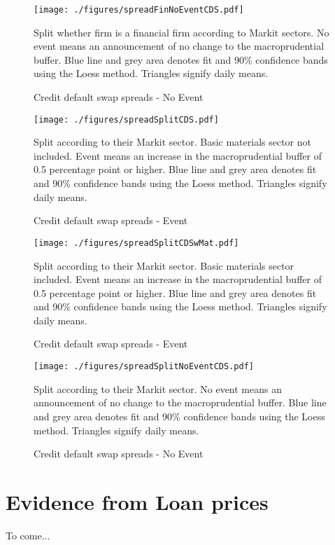 \documentclass[11pt]{article}
\newcommand\fnote[1]{\captionsetup{font=small}\caption*{#1}}
\begin{document}
\begin{figure}%
	\centering
	\texttt{[image: ./figures/spreadFinNoEventCDS.pdf]}
	\caption{Credit default swap spreads - No Event}
	\label{fig:eventCDSFinNoEvent}
	\fnote{Split whether firm is a financial firm according to Markit sectors. No event means an announcement of no change to the macroprudential buffer. Blue line and grey area denotes fit and 90\% confidence bands using the Loess method. Triangles signify daily means.}
\end{figure}


\begin{figure}%
	\centering
	\texttt{[image: ./figures/spreadSplitCDS.pdf]}
	\caption{Credit default swap spreads - Event}
	\label{fig:eventCDSSplit}
	\fnote{Split according to their Markit sector. Basic materials sector not included. Event means an increase in the macroprudential buffer of 0.5 percentage point or higher. Blue line and grey area denotes fit and 90\% confidence bands using the Loess method. Triangles signify daily means.}
\end{figure}


\begin{figure}%
	\centering
	\texttt{[image: ./figures/spreadSplitCDSwMat.pdf]}
	\caption{Credit default swap spreads - Event}
	\label{fig:eventCDSSplitwMat}
	\fnote{Split according to their Markit sector. Basic materials sector included. Event means an increase in the macroprudential buffer of 0.5 percentage point or higher. Blue line and grey area denotes fit and 90\% confidence bands using the Loess method. Triangles signify daily means.}
\end{figure}

\begin{figure}%
	\centering
	\texttt{[image: ./figures/spreadSplitNoEventCDS.pdf]}
	\caption{Credit default swap spreads - No Event}
	\label{fig:eventCDSSplitNoEvent}
	\fnote{Split according to their Markit sector. No event means an announcement of no change to the macroprudential buffer. Blue line and grey area denotes fit and 90\% confidence bands using the Loess method. Triangles signify daily means.}
\end{figure}

\section{Evidence from Loan prices}
To come...
\end{document}
